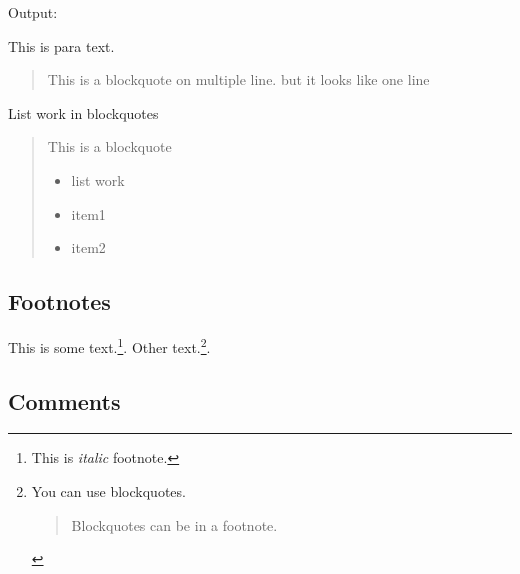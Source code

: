 \documentclass[a4j, titlepage]{jarticle}
\begin{document}
Output:

This is para text.

\begin{quote}
This is a blockquote
on multiple line.
but it looks like one line
\end{quote}

List work in blockquotes

\begin{quotation}
This is a blockquote

\begin{itemize}
\item list work
\item item1
\item item2
\end{itemize}
\end{quotation}

\subsection{Footnotes}

This is some text.\footnote{This is \emph{italic} footnote.}. Other text.\footnote{You can use blockquotes.

\begin{quote}
Blockquotes can be in a footnote.
\end{quote}}.

\subsection{Comments}

\end{document}
